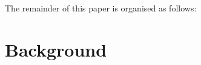 \documentclass[runningheads,a4paper]{llncs}
\begin{document}
%
%
%
%
  
The remainder of this paper is organised as follows: 

\section{Background}
\label{sect:background}
\end{document}
